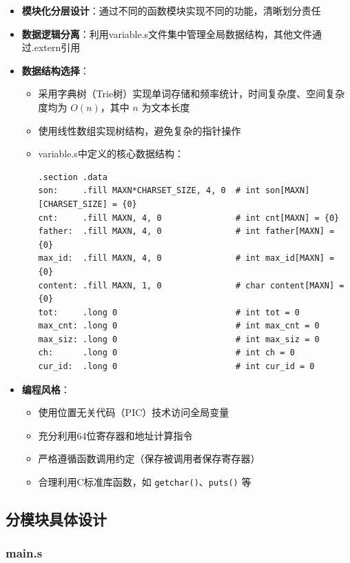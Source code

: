 \documentclass[10pt,a4paper]{article}
\begin{document}
\begin{itemize}
    \item \textbf{模块化分层设计}：通过不同的函数模块实现不同的功能，清晰划分责任
    \item \textbf{数据逻辑分离}：利用variable.s文件集中管理全局数据结构，其他文件通过.extern引用
    \item \textbf{数据结构选择}：
    \begin{itemize}
        \item 采用字典树（Trie树）实现单词存储和频率统计，时间复杂度、空间复杂度均为 \(O(n)\)，其中 \(n\) 为文本长度
        \item 使用线性数组实现树结构，避免复杂的指针操作
        \item variable.s中定义的核心数据结构：
        \begin{lstlisting}[language={[x86masm]Assembler}]
.section .data
son:     .fill MAXN*CHARSET_SIZE, 4, 0  # int son[MAXN][CHARSET_SIZE] = {0}
cnt:     .fill MAXN, 4, 0               # int cnt[MAXN] = {0}
father:  .fill MAXN, 4, 0               # int father[MAXN] = {0}
max_id:  .fill MAXN, 4, 0               # int max_id[MAXN] = {0}
content: .fill MAXN, 1, 0               # char content[MAXN] = {0}
tot:     .long 0                        # int tot = 0
max_cnt: .long 0                        # int max_cnt = 0
max_siz: .long 0                        # int max_siz = 0
ch:      .long 0                        # int ch = 0
cur_id:  .long 0                        # int cur_id = 0
        \end{lstlisting}
    \end{itemize}
    \item \textbf{编程风格}：
    \begin{itemize}
        \item 使用位置无关代码（PIC）技术访问全局变量
        \item 充分利用64位寄存器和地址计算指令
        \item 严格遵循函数调用约定（保存被调用者保存寄存器）
        \item 合理利用C标准库函数，如 \verb|getchar()|、\verb|puts()| 等
    \end{itemize}
\end{itemize}

\subsection{分模块具体设计}

\subsubsection{main.s}
\end{document}
